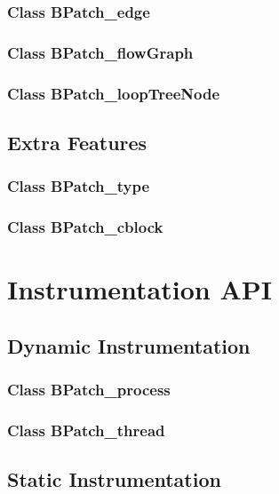 \documentclass{article}
\begin{document}
    \subsubsection{Class BPatch\_edge}
      
    \subsubsection{Class BPatch\_flowGraph}
      
    \subsubsection{Class BPatch\_loopTreeNode}
      

  \subsection{Extra Features}

      \subsubsection{Class BPatch\_type}
      

      \subsubsection{Class BPatch\_cblock}
      

\section{Instrumentation API}

  \subsection{Dynamic Instrumentation}

    \subsubsection{Class BPatch\_process}
      
    \subsubsection{Class BPatch\_thread}
      

  \subsection{Static Instrumentation}
\end{document}
